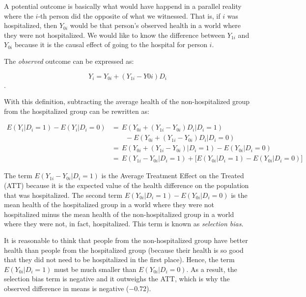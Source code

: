 \documentclass[12pt]{article}
\begin{document}
\noindent A potential outcome is basically what would have happend in a
parallel reality where the $i$-th person did the opposite of what we witnessed.
That is, if $i$ was hospitalized, then $Y_{0i}$ would be that person's observed
health in a world where they were not hospitalized. We would like to know the
difference between $Y_{1i}$ and $Y_{0i}$ because it is the causal effect of
going to the hospital for person $i$.

The \textit{observed} outcome can be expressed as:

\begin{equation*}
    Y_i = Y_{0i} + (Y_{1i} - Y{0i}) D_i
\end{equation*}.

With this definition, subtracting the average health of the non-hospitalized
group from the hospitalized group can be rewritten as:

\begin{equation*}
    \begin{split}
        E(Y_i | D_i = 1) - E(Y_i | D_i = 0)
            & = \, E(Y_{0i} + (Y_{1i} - Y_{0i}) D_i | D_i = 1) \\
            & \qquad - E(Y_{0i} + (Y_{1i} - Y_{0i}) D_i | D_i = 0) \\
            & = \, E(Y_{0i} + (Y_{1i} - Y_{0i}) | D_i = 1)
                - E(Y_{0i} | D_i = 0) \\
            & = \, E(Y_{1i} - Y_{0i} | D_i = 1)
            + \big[ E(Y_{0i} | D_i = 1) - E(Y_{0i} | D_i = 0) \big]
    \end{split}
\end{equation*}

The term $E(Y_{1i} - Y_{0i} | D_i = 1)$ is the Average Treatment Effect on the
Treated (ATT) because it is the expected value of the health difference on the
population that was hospitalized. The second term
$E(Y_{0i} | D_i = 1) - E(Y_{0i} | D_i = 0)$ is the mean health of the
hospitalized group in a world where they were not hospitalized minus the mean
health of the non-hospitalized group in a world where they were not, in fact,
hospitalized. This term is known as \textit{selection bias}.

It is reasonable to think that people from the non-hospitalized group have
better health than people from the hospitalized group (because their health is
so good that they did not need to be hospitalized in the first place). Hence,
the term $E(Y_{0i} | D_i = 1)$ must be much smaller than $E(Y_{0i} | D_i = 0)$.
As a result, the selection bias term is negative and it outweighs the ATT,
which is why the observed difference in means is negative ($-0.72$).
\end{document}

